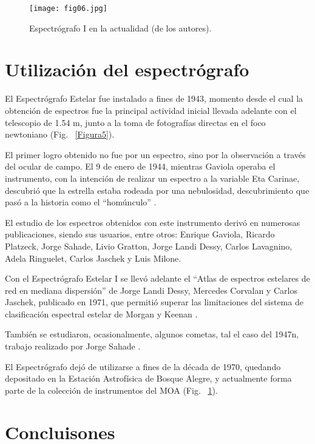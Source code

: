 \documentclass[baaa]{baaa}
\begin{document}
\begin{figure}[!t]
\centering
\texttt{[image: fig06.jpg]}
\caption{Espectrógrafo I en la actualidad (de los autores).}
\label{Figura6}
\end{figure}


\section{Utilización del espectrógrafo}

El Espectrógrafo Estelar fue instalado a fines de 1943, momento desde el cual la obtención de espectros fue la principal actividad inicial llevada adelante con el telescopio de 1.54 m, junto a la toma de fotografías directas en el foco newtoniano (Fig. ~\ref{Figura5}). 

El primer logro obtenido no fue por un espectro, sino por la observación a través del ocular de campo. El 9 de enero de 1944, mientras Gaviola operaba el instrumento, con la intención de realizar un espectro a la variable Eta Carinae, descubrió que la estrella estaba rodeada por una nebulosidad, descubrimiento que pasó a la historia como el “homúnculo” \citep{2023BAAA...64..320P}.

El estudio de los espectros obtenidos con este instrumento derivó en numerosas publicaciones, siendo sus usuarios, entre otros: Enrique Gaviola, Ricardo Platzeck, Jorge Sahade, Livio Gratton, Jorge Landi Dessy, Carlos Lavagnino, Adela Ringuelet, Carlos Jaschek y Luis Milone. 

Con el Espectrógrafo Estelar I se llevó adelante el “Atlas de espectros estelares de red en mediana dispersión” de Jorge Landi Dessy, Mercedes Corvalan y Carlos Jaschek, publicado en 1971, que permitió superar las limitaciones del sistema de clasificación espectral estelar de Morgan y Keenan \citep{1977agss.book.....L}.

También se estudiaron, ocasionalmente, algunos cometas, tal el caso del 1947n, trabajo realizado por Jorge Sahade \citep{1948ApJ...108..159S}.

El Espectrógrafo dejó de utilizarse a fines de la década de 1970, quedando depositado en la Estación Astrofísica de Bosque Alegre, y actualmente forma parte de la colección de instrumentos del MOA (Fig. ~\ref{Figura6}).


\section{Concluisones}
\end{document}
